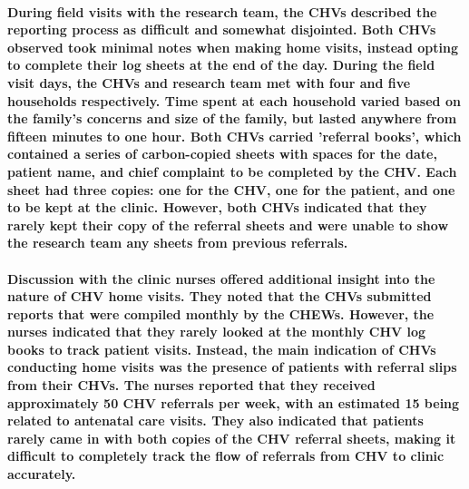 \paragraph{During field visits with the research team, the CHVs described the reporting process as difficult and somewhat disjointed. Both CHVs observed took minimal notes when making home visits, instead opting to complete their log sheets at the end of the day. During the field visit days, the CHVs and research team met with four and five households respectively. Time spent at each household varied based on the family's concerns and size of the family, but lasted anywhere from fifteen minutes to one hour. Both CHVs carried 'referral books', which contained a series of carbon-copied sheets with spaces for the date, patient name, and chief complaint to be completed by the CHV. Each sheet had three copies: one for the CHV, one for the patient, and one to be kept at the clinic. However, both CHVs indicated that they rarely kept their copy of the referral sheets and were unable to show the research team any sheets from previous referrals.}

\paragraph{Discussion with the clinic nurses offered additional insight into the nature of CHV home visits. They noted that the CHVs submitted reports that were compiled monthly by the CHEWs. However, the nurses indicated that they rarely looked at the monthly CHV log books to track patient visits. Instead, the main indication of CHVs conducting home visits was the presence of patients with referral slips from their CHVs. The nurses reported that they received approximately 50 CHV referrals per week, with an estimated 15 being related to antenatal care visits. They also indicated that patients rarely came in with both copies of the CHV referral sheets, making it difficult to completely track the flow of referrals from CHV to clinic accurately.}

